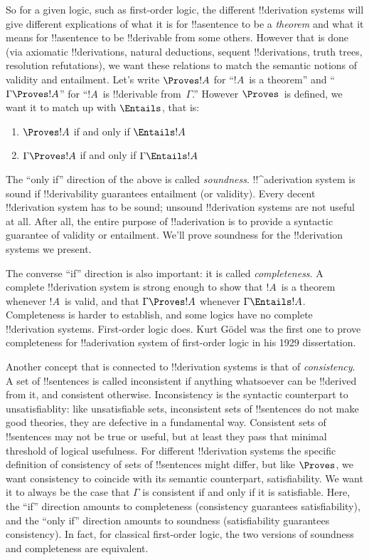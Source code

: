\documentclass[../../../include/open-logic-section]{subfiles}
\begin{document}
So for a given logic, such as first-order logic, the different
!!{derivation} systems will give different explications of what it is
for !!a{sentence} to be a \emph{theorem} and what it means for
!!a{sentence} to be !!{derivable} from some others. However that is
done (via axiomatic !!{derivation}s, natural deductions, sequent
!!{derivation}s, truth trees, resolution refutations), we want these
relations to match the semantic notions of validity and
entailment. Let's write $\Proves !A$ for ``$!A$~is a theorem'' and
``$\Gamma \Proves !A$'' for ``$!A$~is !!{derivable} from~$\Gamma$.''
However $\Proves$~is defined, we want it to match up with $\Entails$,
that is:
\begin{enumerate}
\item $\Proves !A$ if and only if $\Entails !A$
\item $\Gamma \Proves !A$ if and only if $\Gamma \Entails !A$
\end{enumerate}
The ``only if'' direction of the above is called
\emph{soundness}. !!^a{derivation} system is sound if !!{derivability}
guarantees entailment (or validity). Every decent !!{derivation}
system has to be sound; unsound !!{derivation} systems are not useful
at all. After all, the entire purpose of !!a{derivation} is to provide
a syntactic guarantee of validity or entailment. We'll prove soundness
for the !!{derivation} systems we present.

The converse ``if'' direction is also important: it is called
\emph{completeness}. A complete !!{derivation} system is strong enough
to show that $!A$~is a theorem whenever $!A$~is valid, and that
$\Gamma \Proves !A$ whenever $\Gamma \Entails !A$.
Completeness is harder to establish, and some logics have no complete
!!{derivation} systems. First-order logic does. Kurt G\"odel was the
first one to prove completeness for !!a{derivation} system of
first-order logic in his 1929 dissertation.

Another concept that is connected to !!{derivation} systems is that of
\emph{consistency}. A set of !!{sentence}s is called inconsistent if
anything whatsoever can be !!{derive}d from it, and consistent
otherwise.  Inconsistency is the syntactic counterpart to
unsatisfiablity: like unsatisfiable sets, inconsistent sets of
!!{sentence}s do not make good theories, they are defective in a
fundamental way. Consistent sets of !!{sentence}s may not be true or
useful, but at least they pass that minimal threshold of logical
usefulness.  For different !!{derivation} systems the specific
definition of consistency of sets of !!{sentence}s might differ, but
like $\Proves$, we want consistency to coincide with its semantic
counterpart, satisfiability. We want it to always be the case that
$\Gamma$ is consistent if and only if it is satisfiable. Here, the
``if'' direction amounts to completeness (consistency guarantees
satisfiability), and the ``only if'' direction amounts to soundness
(satisfiability guarantees consistency).  In fact, for classical
first-order logic, the two versions of soundness and completeness are
equivalent.
\end{document}
